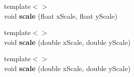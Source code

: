 \begin{DoxyCompactItemize}
\item 
\hypertarget{class_box_ad827b74de4047e4452d4c9231ffd2e4f}{
{\footnotesize template$<$$>$ }\\void {\bfseries scale} (float xScale, float yScale)}
\label{class_box_ad827b74de4047e4452d4c9231ffd2e4f}

\item 
\hypertarget{class_box_a925d4ac6fe269c65b630be2c75b505c5}{
{\footnotesize template$<$$>$ }\\void {\bfseries scale} (double xScale, double yScale)}
\label{class_box_a925d4ac6fe269c65b630be2c75b505c5}

\item 
\hypertarget{class_box_a20af7b40edd61556f1d5cf74c66a3d4d}{
{\footnotesize template$<$$>$ }\\void {\bfseries scale} (double xScale, double yScale)}
\label{class_box_a20af7b40edd61556f1d5cf74c66a3d4d}

\end{DoxyCompactItemize}
